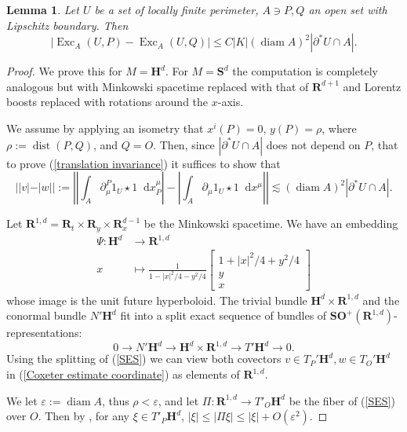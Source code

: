\documentclass[reqno,10pt]{amsart}
\newcommand{\RR}{\mathbf{R}}
\newcommand{\Hyp}{\mathbf H}
\newcommand{\Sph}{\mathbf S}
\newcommand{\SpOrth}{\mathbf{SO}}
\DeclareMathOperator{\diam}{diam}
\DeclareMathOperator{\Exc}{Exc}
\newcommand*\dif{\mathop{}\!\mathrm{d}}
\DeclareMathOperator{\dist}{dist}
\newtheorem{lemma}[theorem]{Lemma}
\theoremstyle{definition}
\numberwithin{equation}{section}
\begin{document}
\begin{lemma}
Let $U$ be a set of locally finite perimeter, $A \ni P, Q$ an open set with Lipschitz boundary. Then
\begin{equation}\label{translation invariance}
|\Exc_A(U, P) - \Exc_A(U, Q)| \leq C|K|(\diam A)^2 |\partial^* U \cap A|.
\end{equation}
\end{lemma}
\begin{proof}
We prove this for $M = \Hyp^d$. For $M = \Sph^d$ the computation is completely analogous but with Minkowski spacetime replaced with that of $\RR^{d + 1}$ and Lorentz boosts replaced with rotations around the $x$-axis. 

We assume by applying an isometry that $x^i(P) = 0$, $y(P) = \rho$, where $\rho := \dist(P, Q)$, and $Q = O$.
Then, since $|\partial^* U \cap A|$ does not depend on $P$, that to prove (\ref{translation invariance}) it suffices to show that
\begin{equation} \label{Coxeter estimate coordinate}
||v| - |w|| := \left|\left|\int_A \partial_\mu^P 1_U \star 1 \dif x^\mu_P\right| - \left|\int_A \partial_\mu 1_U \star 1 \dif x^\mu\right|\right| \lesssim (\diam A)^2 |\partial^* U \cap A|.
\end{equation}

Let $\RR^{1, d} = \RR_t \times \RR_y \times \RR_x^{d - 1}$ be the Minkowski spacetime.
We have an embedding
\begin{align*}
\Psi: \Hyp^d &\to \RR^{1, d} \\
x &\mapsto \frac{1}{1 - |x|^2/4 - y^2/4} \begin{bmatrix}1 + |x|^2/4 + y^2/4\\y \\ x\end{bmatrix}
\end{align*}
whose image is the unit future hyperboloid.
The trivial bundle $\Hyp^d \times \RR^{1, d}$ and the conormal bundle $N'\Hyp^d$ fit into a split exact sequence of bundles of $\SpOrth^+(\RR^{1, d})$-representations:
\begin{equation}\label{SES}
0 \to N'\Hyp^d \to \Hyp^d \times \RR^{1, d} \to T'\Hyp^d \to 0.
\end{equation}
Using the splitting of (\ref{SES}) we can view both covectors $v \in T_P' \Hyp^d, w \in T_O' \Hyp^d$ in (\ref{Coxeter estimate coordinate}) as elements of $\RR^{1, d}$.

We let $\varepsilon := \diam A$, thus $\rho < \varepsilon$, and let $\Pi: \RR^{1, d} \to T'_O\Hyp^d$ be the fiber of (\ref{SES}) over $O$.
Then by \cite[Lemma 4.2]{daskalopoulosPrep1}, for any $\xi \in T'_P \Hyp^d$, $|\xi| \leq |\Pi \xi| \leq |\xi| + O(\varepsilon^2)$.


\end{proof}
\end{document}
